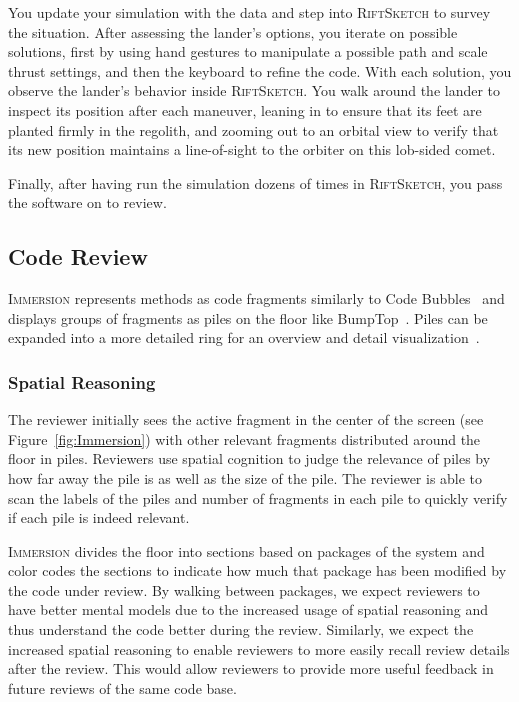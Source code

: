 \documentclass[conference]{IEEEtran}
\begin{document}
You update your simulation with the data and step into \textsc{RiftSketch} to survey the situation. 
After assessing the lander's options, you iterate on possible solutions, first by using hand gestures to manipulate a possible path and scale thrust settings, 
and then the keyboard to refine the code. 
With each solution, you observe the lander's behavior inside \textsc{RiftSketch}.
You walk around the lander to inspect its position after each maneuver, leaning in to ensure that its feet are planted firmly in the regolith, and zooming out to an orbital view to verify that its new position maintains a line-of-sight to the orbiter on this lob-sided comet. 

Finally, after having run the simulation dozens of times in \textsc{RiftSketch}, you pass the software on to review.




\subsection{Code Review}


\textsc{Immersion} represents methods as code fragments similarly to Code Bubbles~\cite{Bragdon:CodeBubbles} and displays groups of fragments as piles on the floor like BumpTop~\cite{Agarawala:BumpTop}.
Piles can be expanded into a more detailed ring for an overview and detail visualization~\cite{Shneiderman:InfoVisTaxonomy}.






\subsubsection{Spatial Reasoning}

The reviewer initially sees the active fragment in the center of the screen (see Figure~\ref{fig:Immersion}) with other relevant fragments distributed around the floor in piles. 
Reviewers use spatial cognition to judge the relevance of piles by how far away the pile is as well as the size of the pile.
The reviewer is able to scan the labels of the piles and number of fragments in each pile to quickly verify if each pile is indeed relevant.



\textsc{Immersion} divides the floor into sections based on packages of the system and color codes the sections to indicate how much that package has been modified by the code under review.
By walking between packages, we expect reviewers to have better mental models due to the increased usage of spatial reasoning and thus understand the code better during the review.
Similarly, we expect the increased spatial reasoning to enable reviewers to more easily recall review details after the review.
This would allow reviewers to provide more useful feedback in future reviews of the same code base.
\end{document}
